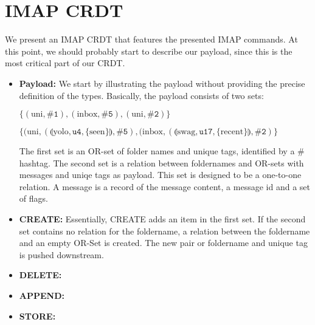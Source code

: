 \documentclass[a4paper]{scrartcl}
\begin{document}
\section{IMAP CRDT}

We present an IMAP CRDT that features the presented IMAP commands. At this point,
we should probably start to describe our payload, since this is the most critical
part of our CRDT.

\begin{itemize}
  \item \textbf{Payload:} We start by illustrating the payload without providing
  the precise definition of the types. Basically, the payload consists of two
  sets:

  $\{(\text{uni},\texttt{\#1}), (\text{inbox},\texttt{\#5}), (\text{uni},\texttt{\#2})\}$

  $\{(\text{uni},(\llparenthesis \text{yolo}, \texttt{u4}, \{\text{seen}\} \rrparenthesis,\texttt{\#5}),
  (\text{inbox},(\llparenthesis \text{swag}, \texttt{u17}, \{\text{recent}\} \rrparenthesis,\texttt{\#2})\}$

  The first set is an OR-set of folder names and unique tags, identified by a $\#$hashtag.
  The second set is a relation between foldernames and OR-sets with messages and uniqe tags as payload.
  This set is designed to be a one-to-one relation. A message is a record of the message content, a message id and
  a set of flags.

  \item \textbf{CREATE:} Essentially, CREATE adds an item in the first set. If the second set contains
  no relation for the foldername, a relation between the foldername and an empty OR-Set is created.
  The new pair or foldername and unique tag is pushed downstream.
  \item \textbf{DELETE:}
  \item \textbf{APPEND:}
  \item \textbf{STORE:}

\end{itemize}





\end{document}
